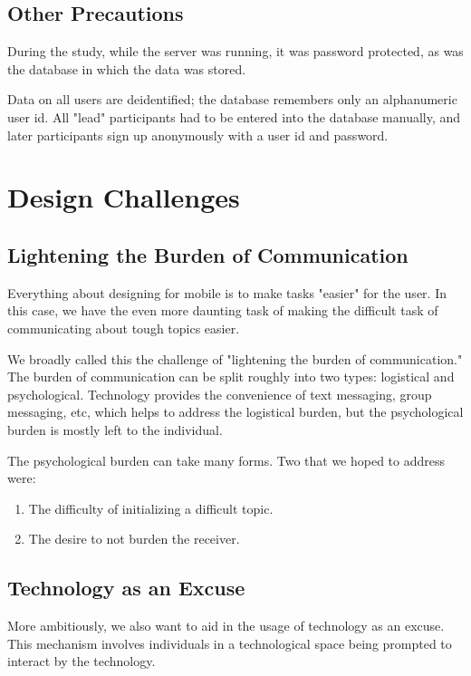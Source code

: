       \subsection{Other Precautions}
      During the study, while the server was running, it was password protected,
      as was the database in which the data was stored.

      Data on all users are deidentified;
      the database remembers only an alphanumeric user id.
      All "lead" participants had to be entered into the database manually,
      and later participants sign up anonymously with a user id and password.

  \section{Design Challenges}
    \subsection{Lightening the Burden of Communication}
    Everything about designing for mobile is to make tasks "easier" for the user.
    In this case, we have the even more daunting task of making
    the difficult task of communicating about tough topics easier.

    We broadly called this the challenge of "lightening the burden of communication."
    The burden of communication can be split roughly into two types:
    logistical and psychological.
    Technology provides the convenience of text messaging,
    group messaging, etc, which helps to address the logistical burden,
    but the psychological burden is mostly left to the individual.

    The psychological burden can take many forms.
    Two that we hoped to address were:
    \begin{enumerate}
    \item The difficulty of initializing a difficult topic.
    \item The desire to not burden the receiver.
    \end{enumerate}

    \subsection{Technology as an Excuse}
    More ambitiously, we also want to aid in the usage of technology as an excuse.
    This mechanism involves individuals in a technological space being prompted
    to interact by the technology.
    
